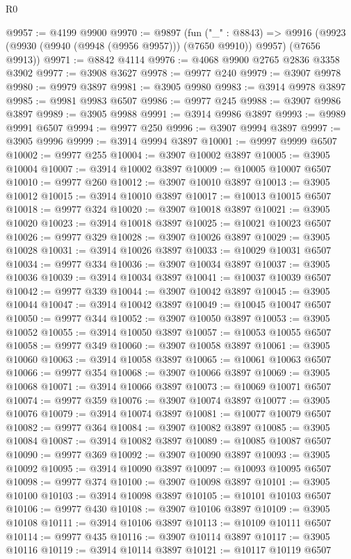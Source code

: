 \begin{lexlean}{R0}
\begin{coremodule}
@9957 := @4199 @9900
@9970 := @9897
    (fun ("_" : @8843) =>
    @9916 (@9923 (@9930 (@9940 (@9948 (@9956 @9957))) (@7650 @9910)) @9957) (@7656 @9913))
@9971 := @8842 @4114
@9976 := @4068 @9900 @2765 @2836 @3358 @3902
@9977 := @3908 @3627
@9978 := @9977 @240
@9979 := @3907 @9978
@9980 := @9979 @3897
@9981 := @3905 @9980
@9983 := @3914 @9978 @3897
@9985 := @9981 @9983 @6507
@9986 := @9977 @245
@9988 := @3907 @9986 @3897
@9989 := @3905 @9988
@9991 := @3914 @9986 @3897
@9993 := @9989 @9991 @6507
@9994 := @9977 @250
@9996 := @3907 @9994 @3897
@9997 := @3905 @9996
@9999 := @3914 @9994 @3897
@10001 := @9997 @9999 @6507
@10002 := @9977 @255
@10004 := @3907 @10002 @3897
@10005 := @3905 @10004
@10007 := @3914 @10002 @3897
@10009 := @10005 @10007 @6507
@10010 := @9977 @260
@10012 := @3907 @10010 @3897
@10013 := @3905 @10012
@10015 := @3914 @10010 @3897
@10017 := @10013 @10015 @6507
@10018 := @9977 @324
@10020 := @3907 @10018 @3897
@10021 := @3905 @10020
@10023 := @3914 @10018 @3897
@10025 := @10021 @10023 @6507
@10026 := @9977 @329
@10028 := @3907 @10026 @3897
@10029 := @3905 @10028
@10031 := @3914 @10026 @3897
@10033 := @10029 @10031 @6507
@10034 := @9977 @334
@10036 := @3907 @10034 @3897
@10037 := @3905 @10036
@10039 := @3914 @10034 @3897
@10041 := @10037 @10039 @6507
@10042 := @9977 @339
@10044 := @3907 @10042 @3897
@10045 := @3905 @10044
@10047 := @3914 @10042 @3897
@10049 := @10045 @10047 @6507
@10050 := @9977 @344
@10052 := @3907 @10050 @3897
@10053 := @3905 @10052
@10055 := @3914 @10050 @3897
@10057 := @10053 @10055 @6507
@10058 := @9977 @349
@10060 := @3907 @10058 @3897
@10061 := @3905 @10060
@10063 := @3914 @10058 @3897
@10065 := @10061 @10063 @6507
@10066 := @9977 @354
@10068 := @3907 @10066 @3897
@10069 := @3905 @10068
@10071 := @3914 @10066 @3897
@10073 := @10069 @10071 @6507
@10074 := @9977 @359
@10076 := @3907 @10074 @3897
@10077 := @3905 @10076
@10079 := @3914 @10074 @3897
@10081 := @10077 @10079 @6507
@10082 := @9977 @364
@10084 := @3907 @10082 @3897
@10085 := @3905 @10084
@10087 := @3914 @10082 @3897
@10089 := @10085 @10087 @6507
@10090 := @9977 @369
@10092 := @3907 @10090 @3897
@10093 := @3905 @10092
@10095 := @3914 @10090 @3897
@10097 := @10093 @10095 @6507
@10098 := @9977 @374
@10100 := @3907 @10098 @3897
@10101 := @3905 @10100
@10103 := @3914 @10098 @3897
@10105 := @10101 @10103 @6507
@10106 := @9977 @430
@10108 := @3907 @10106 @3897
@10109 := @3905 @10108
@10111 := @3914 @10106 @3897
@10113 := @10109 @10111 @6507
@10114 := @9977 @435
@10116 := @3907 @10114 @3897
@10117 := @3905 @10116
@10119 := @3914 @10114 @3897
@10121 := @10117 @10119 @6507

\end{coremodule}
\end{lexlean}
